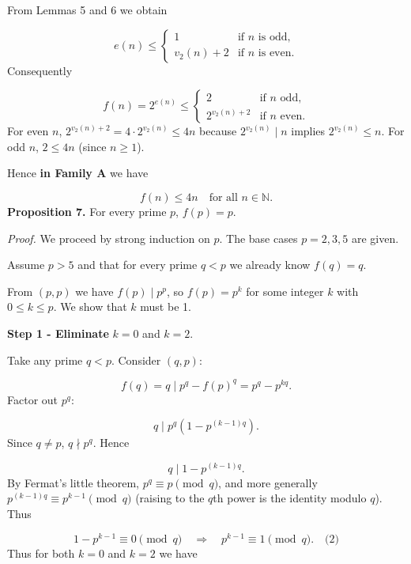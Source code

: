 From Lemmas 5 and 6 we obtain

\[
e(n)\le \begin{cases}
1 & \text{if } n \text{ is odd},\\
v_{2}(n)+2 & \text{if } n \text{ is even}.
\end{cases}
\]
Consequently\par
\[
f(n)=2^{e(n)}\le \begin{cases}
2 & \text{if } n \text{ odd},\\
2^{v_{2}(n)+2} & \text{if } n \text{ even}.
\end{cases}
\]
For even \(n\), \(2^{v_{2}(n)+2}=4\cdot2^{v_{2}(n)}\le 4n\) because \(2^{v_{2}(n)}\mid n\) implies \(2^{v_{2}(n)}\le n\). For odd \(n\), \(2\le 4n\) (since \(n\ge1\)).\par
Hence \textbf{in Family A} we have\par
\[
\boxed{f(n)\le4n\quad\text{for all }n\in\mathbb N}.
\]
\smallskip
{}
\textbf{Proposition 7.} For every prime \(p\), \(f(p)=p\).\par
\emph{Proof.} We proceed by strong induction on \(p\). The base cases \(p=2,3,5\) are given.\par
Assume \(p>5\) and that for every prime \(q<p\) we already know \(f(q)=q\).\par
From \((p,p)\) we have \(f(p)\mid p^{p}\), so \(f(p)=p^{k}\) for some integer \(k\) with \(0\le k\le p\). We show that \(k\) must be 1.\par
\smallskip
\textbf{Step 1 - Eliminate }\(k=0\) and \(k=2\).\textbf{}\par
Take any prime \(q<p\). Consider \((q,p)\):\par
\[
f(q)=q\mid p^{q}-f(p)^{q}=p^{q}-p^{kq}.
\]
Factor out \(p^{q}\):\par
\[
q\mid p^{q}(1-p^{(k-1)q}).
\]
Since \(q\neq p\), \(q\nmid p^{q}\). Hence\par
\[
q\mid 1-p^{(k-1)q}.
\]
By Fermat's little theorem, \(p^{q}\equiv p\pmod q\), and more generally \(p^{(k-1)q}\equiv p^{k-1}\pmod q\) (raising to the \(q\)th power is the identity modulo \(q\)). Thus\par
\[
1-p^{k-1}\equiv 0\pmod q\quad\Longrightarrow\quad p^{k-1}\equiv 1\pmod q. \quad\text{(2)}
\]
Thus for both \(k=0\) and \(k=2\) we have\par
